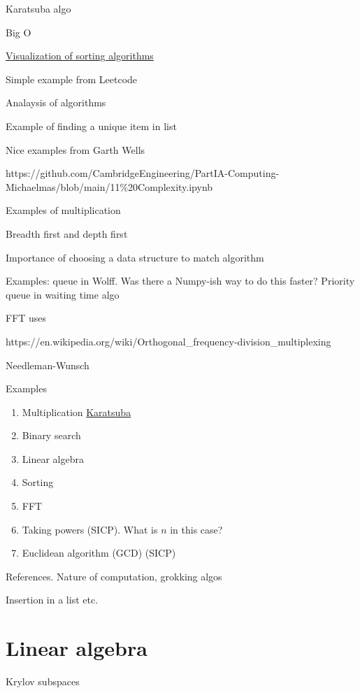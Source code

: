 \documentclass[
  letterpaper,
  DIV=11,
  numbers=noendperiod]{scrreprt}
\providecommand{\tightlist}{%
  \setlength{\itemsep}{0pt}\setlength{\parskip}{0pt}}\usepackage{longtable,booktabs,array}
\theoremstyle{definition}
\theoremstyle{remark}
\begin{document}
Karatsuba algo

Big O

\href{https://www.sortvisualizer.com/}{Visualization of sorting
algorithms}

Simple example from Leetcode

Analaysis of algorithms

Example of finding a unique item in list

Nice examples from Garth Wells

https://github.com/CambridgeEngineering/PartIA-Computing-Michaelmas/blob/main/11\%20Complexity.ipynb

Examples of multiplication

Breadth first and depth first

Importance of choosing a data structure to match algorithm

Examples: queue in Wolff. Was there a Numpy-ish way to do this faster?
Priority queue in waiting time algo

FFT uses

https://en.wikipedia.org/wiki/Orthogonal\_frequency-division\_multiplexing

Needleman-Wunsch

Examples

\begin{enumerate}
\def\labelenumi{\arabic{enumi}.}
\tightlist
\item
  Multiplication
  \href{https://en.wikipedia.org/wiki/Multiplication_algorithm\#Karatsuba_multiplication}{Karatsuba}
\item
  Binary search
\item
  Linear algebra
\item
  Sorting
\item
  FFT
\item
  Taking powers (SICP). What is \(n\) in this case?
\item
  Euclidean algorithm (GCD) (SICP)
\end{enumerate}

References. Nature of computation, grokking algos

Insertion in a list etc.


\hypertarget{linear-algebra}{%
\chapter{Linear algebra}\label{linear-algebra}}

Krylov subspaces
\end{document}
